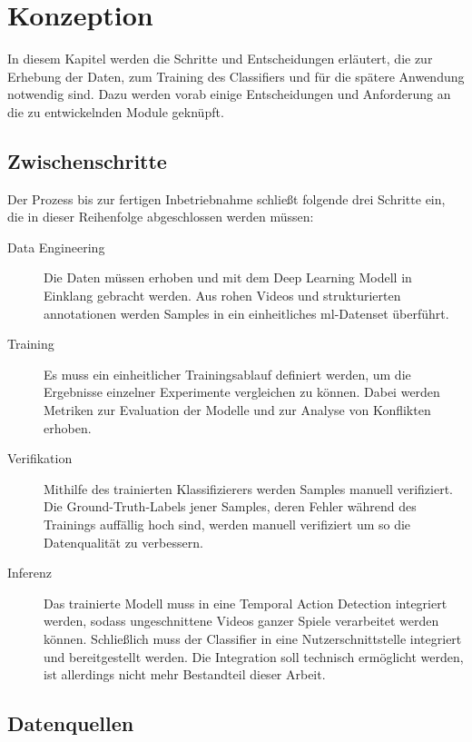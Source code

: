 \chapter{Konzeption}
\label{ch:concept}

In diesem Kapitel werden die Schritte und Entscheidungen erläutert, die zur Erhebung der Daten, zum Training des Classifiers und für die spätere Anwendung notwendig sind.
Dazu werden vorab einige Entscheidungen und Anforderung an die zu entwickelnden Module geknüpft.

\section{Zwischenschritte}
\label{sec:steps}

Der Prozess bis zur fertigen Inbetriebnahme schließt folgende drei Schritte ein, die in dieser Reihenfolge abgeschlossen werden müssen:

\begin{description}
    \item[Data Engineering] Die Daten müssen erhoben und mit dem Deep Learning Modell in Einklang gebracht werden.
    Aus rohen Videos und strukturierten \gls{annotationen} werden Samples in ein einheitliches \gls{ml}-Datenset überführt.
    \item[Training] Es muss ein einheitlicher Trainingsablauf definiert werden, um die Ergebnisse einzelner Experimente vergleichen zu können.
    Dabei werden Metriken zur Evaluation der Modelle und zur Analyse von Konflikten erhoben.
    \item[Verifikation] Mithilfe des trainierten Klassifizierers werden Samples manuell verifiziert.
    Die Ground-Truth-Labels jener Samples, deren Fehler während des Trainings auffällig hoch sind, werden manuell verifiziert um so die Datenqualität zu verbessern.
    \item[Inferenz] Das trainierte Modell muss in eine Temporal Action Detection integriert werden, sodass ungeschnittene Videos ganzer Spiele verarbeitet werden können.
    Schließlich muss der Classifier in eine Nutzerschnittstelle integriert und bereitgestellt werden.
    Die Integration soll technisch ermöglicht werden, ist allerdings nicht mehr Bestandteil dieser Arbeit.
\end{description}

\section{Datenquellen}
\label{sec:datenquellen}

